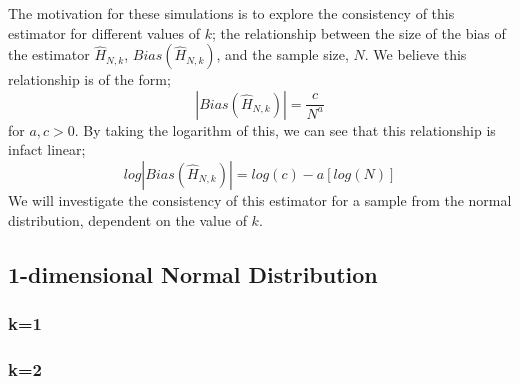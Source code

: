 \documentclass{article}
\begin{document}
The motivation for these simulations is to explore the consistency of this estimator for different values of $k$; the relationship between the size of the bias of the estimator $\hat{H}_{N, k}$, $Bias(\hat{H}_{N, k})$,  and the sample size, $N$. We believe this relationship is of the form;
\begin{equation}
|Bias(\hat{H}_{N, k})| = \frac{c}{N^a}
\end{equation}
for $a, c > 0$. By taking the logarithm of this, we can see that this relationship is infact linear;
\begin{equation}
log|Bias(\hat{H}_{N, k})| = log(c) - a [log(N)]
\end{equation}
We will investigate the consistency of this estimator for a sample from the normal distribution, dependent on the value of $k$.

\subsection{1-dimensional Normal Distribution}

\subsubsection{k=1}


\subsubsection{k=2}
\end{document}
